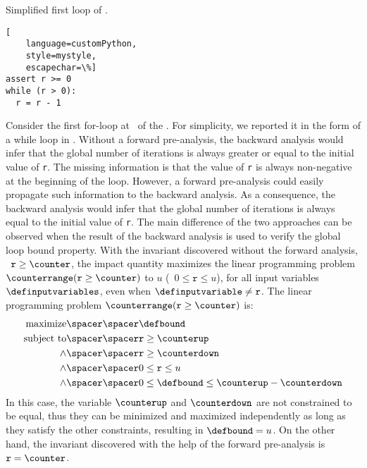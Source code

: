 \begin{marginlisting}[*5]
  \caption{Simplified first loop of .}
  \vspace{13pt}
  \begin{lstlisting}[
    language=customPython,
    style=mystyle,
    escapechar=\%]
assert r >= 0
while (r > 0):
  r = r - 1
\end{lstlisting}
\end{marginlisting}
\begin{example}
  Consider the first for-loop at~ of the .
  For simplicity, we reported it in the form of a while loop in .
Without a forward pre-analysis, the backward analysis would infer that the global number of iterations is always greater or equal to the initial value of \texttt{r}.
The missing information is that the value of \texttt{r} is always non-negative at the beginning of the loop.
%
However, a forward pre-analysis could easily propagate such information to the backward analysis.
As a consequence, the backward analysis would infer that the global number of iterations is always equal to the initial value of \texttt{r}.
The main difference of the two approaches can be observed when the result of the backward analysis is used to verify the global loop bound property.
With the invariant discovered without the forward analysis, \cf~$\texttt{r} \ge \counter$, the impact quantity maximizes the linear programming problem $\counterrange(\texttt{r} \ge \counter)$ to $u$ (\cf~$0 \le \texttt{r} \le u$), for all input variables $\definputvariables$, even when $\definputvariable \neq \texttt{r}$.
The linear programming problem $\counterrange(\texttt{r} \ge \counter)$ is:
\begin{align}
  \text{maximize} \spacer\spacer& \defbound \\
  \text{subject to} \spacer\spacer
    & \texttt{r} \ge \counterup \\
    \land\spacer\spacer& \texttt{r} \ge \counterdown \\
    \land\spacer\spacer& 0\le \texttt{r} \le u \\
    \land\spacer\spacer& 0 \le \defbound \le \counterup - \counterdown
\end{align}
In this case, the variable $\counterup$ and $\counterdown$ are not constrained to be equal, thus they can be minimized and maximized independently as long as they satisfy the other constraints, resulting in $\defbound = u$.
%
On the other hand, the invariant discovered with the help of the forward pre-analysis is $\texttt{r} = \counter$.

\end{example}
